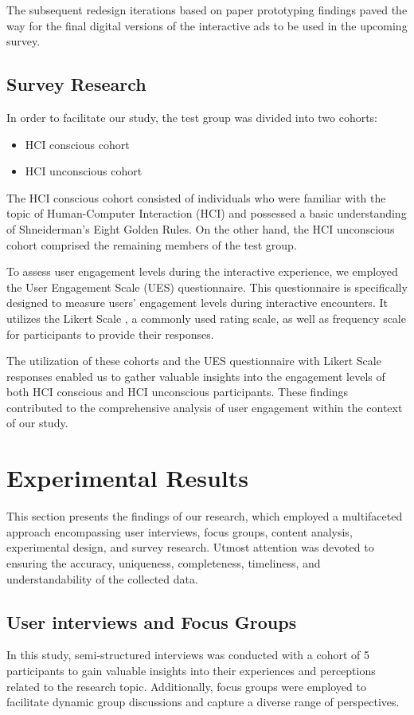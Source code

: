 \documentclass[journal]{IEEEtran}
\begin{document}
The subsequent redesign iterations based on paper prototyping findings paved the way for the final
digital versions of the interactive ads to be used in the upcoming survey.

\subsection{Survey Research}

In order to facilitate our study, the test group was divided into two cohorts:
\begin{itemize}
    \item HCI conscious cohort
    \item HCI unconscious cohort
\end{itemize}
The HCI conscious cohort consisted of individuals who were familiar with the
topic of Human-Computer Interaction (HCI) and possessed a basic understanding
of Shneiderman's Eight Golden Rules. On the other hand, the HCI unconscious
cohort comprised the remaining members of the test group.

To assess user engagement levels during the interactive experience, we employed
the User Engagement Scale (UES) questionnaire. This questionnaire is specifically
designed to measure users' engagement levels during interactive encounters. \cite{obrien2008user}
It utilizes the Likert Scale \cite{likert1932technique}, a commonly used rating scale, as well as frequency scale for participants
to provide their responses.

The utilization of these cohorts and the UES questionnaire with Likert Scale
responses enabled us to gather valuable insights into the engagement levels
of both HCI conscious and HCI unconscious participants. These findings contributed
to the comprehensive analysis of user engagement within the context of our study.

\section{Experimental Results}
This section presents the findings of our research, which employed a multifaceted
approach encompassing user interviews, focus groups, content analysis, experimental
design, and survey research. Utmost attention was devoted to ensuring the accuracy,
uniqueness, completeness, timeliness, and understandability of the collected data.

\subsection{User interviews and Focus Groups}
In this study, semi-structured interviews was conducted with a cohort of 5 participants to gain valuable
insights into their experiences and perceptions related to the research topic. Additionally,
focus groups were employed to facilitate dynamic group discussions and capture a diverse
range of perspectives.
\end{document}
